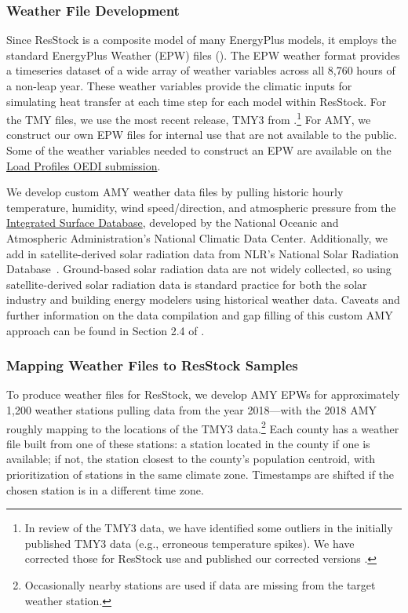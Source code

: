 \subsubsection{Weather File Development}

Since ResStock is a composite model of many EnergyPlus models, it employs the standard EnergyPlus Weather (EPW) files (\cite{BigLadderSoftware2015}). The EPW weather format provides a timeseries dataset of a wide array of weather variables across all 8,760 hours of a non-leap year. These weather variables provide the climatic inputs for simulating heat transfer at each time step for each model within ResStock. For the TMY files, we use the most recent release, TMY3 from \citet{Wilcox2008}.\footnote{In review of the TMY3 data, we have identified some outliers in the initially published TMY3 data (e.g., erroneous temperature spikes). We have corrected those for ResStock use and published our corrected versions \citep{Bianchi2021}. }  For AMY,  we construct our own EPW files for internal use that are not available to the public. Some of the weather variables needed to construct an EPW are available on the \href{https://data.openei.org/submissions/4520}{Load Profiles OEDI submission}.

We develop custom AMY weather data files by pulling historic hourly temperature, humidity, wind speed/direction, and atmospheric pressure from the \href{https://www.ncei.noaa.gov/products/land-based-station/integrated-surface-database}{Integrated Surface Database}, developed by the National Oceanic and Atmospheric Administration's National Climatic Data Center. Additionally, we add in satellite-derived solar radiation data from NLR’s National Solar Radiation Database~\citep{nsrdb}. Ground-based solar radiation data are not widely collected, so using satellite-derived solar radiation data is standard practice for both the solar industry and building energy modelers using historical weather data. Caveats and further information on the data compilation and gap filling of this custom AMY approach can be found in Section 2.4 of \citet{Wilson2022}.

\subsubsection{Mapping Weather Files to ResStock Samples}
To produce weather files for ResStock, we develop AMY EPWs for approximately 1,200 weather stations pulling data from the year 2018---with the 2018 AMY roughly mapping to the locations of the TMY3 data.\footnote{Occasionally nearby stations are used if data are missing from the target weather station.} Each county has a weather file built from one of these stations: a station located in the county if one is available; if not, the station closest to the county's population centroid, with prioritization of stations in the same climate zone. Timestamps are shifted if the chosen station is in a different time zone.

